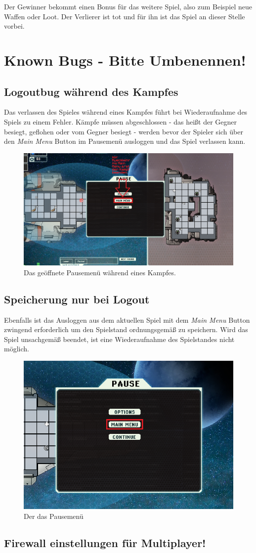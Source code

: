 \documentclass[fontsize=12pt,paper=a4,twoside]{scrartcl}
\begin{document}
Der Gewinner bekommt einen Bonus für das weitere Spiel, also zum Beispiel neue Waffen oder Loot. Der Verlierer ist tot und für ihn ist das Spiel an dieser Stelle vorbei. 

\newpage
\section{Known Bugs - Bitte Umbenennen!}

\subsection{Logoutbug während des Kampfes}

Das verlassen des Spieles während eines Kampfes führt bei Wiederaufnahme des Spiels zu einem Fehler. Kämpfe müssen abgeschlossen - das heißt der Gegner besiegt, geflohen oder vom Gegner besiegt - werden bevor der Spieler sich über den \textit{Main Menu} Button im Pausemenü ausloggen und das Spiel verlassen kann.

\begin{figure}[H]
\centering
\includegraphics[width=0.8\linewidth]{DasSpiel/known Bugs/Battle-Option-Logout.png}
\caption{Das geöffnete Pausemenü während eines Kampfes.}
\end{figure} 

\subsection{Speicherung nur bei Logout}

Ebenfalls ist das Ausloggen aus dem aktuellen Spiel mit dem \textit{Main Menu} Button zwingend erforderlich um den Spielstand ordnungsgemäß zu speichern. Wird das Spiel unsachgemäß beendet, ist eine Wiederaufnahme des Spielstandes nicht möglich.

\begin{figure}[H]
\centering
\includegraphics[width=0.8\linewidth]{DasSpiel/known Bugs/Pause-Menu.png}
\caption{Der das Pausemenü}
\end{figure}

\subsection{Firewall einstellungen für Multiplayer!}
\end{document}
